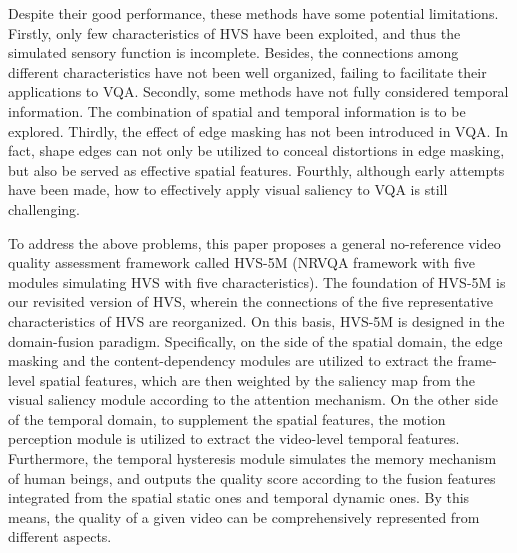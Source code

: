 \documentclass[journal]{IEEEtran}
\begin{document}
Despite their good performance, these methods have some potential limitations.
Firstly, only few characteristics of HVS have been exploited, and thus the simulated sensory function is incomplete. Besides, the connections among different characteristics have not been well organized, failing to facilitate their applications to VQA.
Secondly, some methods have not fully considered temporal information. The combination of spatial and temporal information is to be explored.
Thirdly, the effect of edge masking has not been introduced in VQA. In fact, shape edges can not only be utilized to conceal distortions in edge masking, but also be served as effective spatial features.
Fourthly, although early attempts have been made, how to effectively apply visual saliency to VQA is still challenging.












To address the above problems, this paper proposes a
general no-reference video quality assessment framework called HVS-5M (NRVQA framework with five modules simulating HVS with five characteristics).
The foundation of HVS-5M is our revisited version of HVS, wherein the connections of the five representative characteristics of HVS are reorganized.
On this basis, HVS-5M is designed in the domain-fusion paradigm.
Specifically, on the side of the spatial domain, the edge masking and the content-dependency modules are utilized to extract the frame-level spatial features, which are then weighted by the saliency map from the visual saliency module according to the attention mechanism.
On the other side of the temporal domain, to supplement the spatial features,
the motion perception module is utilized to extract the video-level temporal features.
Furthermore, the temporal hysteresis module simulates the memory mechanism of human beings, and outputs the quality score according to the fusion features integrated from the spatial static ones and temporal dynamic ones.
By this means, the quality of a given video can be comprehensively represented from different aspects.
\end{document}
